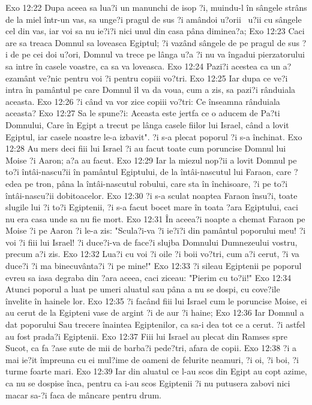Exo 12:22  Dupa aceea sa lua?i un manunchi de isop ?i, muindu-l în sângele strâns de la miel într-un vas, sa unge?i pragul de sus ?i amândoi u?orii  u?ii cu sângele cel din vas, iar voi sa nu ie?i?i nici unul din casa pâna diminea?a;
Exo 12:23  Caci are sa treaca Domnul sa loveasca Egiptul; ?i vazând sângele de pe pragul de sus ?i de pe cei doi u?ori, Domnul va trece pe lânga u?a ?i nu va îngadui pierzatorului sa intre în casele voastre, ca sa va loveasca.
Exo 12:24  Pazi?i acestea ca un a?ezamânt ve?nic pentru voi ?i pentru copiii vo?tri.
Exo 12:25  Iar dupa ce ve?i intra în pamântul pe care Domnul îl va da voua, cum a zis, sa pazi?i rânduiala aceasta.
Exo 12:26  ?i când va vor zice copiii vo?tri: Ce înseamna rânduiala aceasta?
Exo 12:27  Sa le spune?i: Aceasta este jertfa ce o aducem de Pa?ti Domnului, Care în Egipt a trecut pe lânga casele fiilor lui Israel, când a lovit Egiptul, iar casele noastre le-a izbavit". ?i s-a plecat poporul ?i s-a închinat.
Exo 12:28  Au mers deci fiii lui Israel ?i au facut toate cum poruncise Domnul lui Moise ?i Aaron; a?a au facut.
Exo 12:29  Iar la miezul nop?ii a lovit Domnul pe to?i întâi-nascu?ii în pamântul Egiptului, de la întâi-nascutul lui Faraon, care ?edea pe tron, pâna la întâi-nascutul robului, care sta în închisoare, ?i pe to?i întâi-nascu?ii dobitoacelor.
Exo 12:30  ?i s-a sculat noaptea Faraon însu?i, toate slugile lui ?i to?i Egiptenii, ?i s-a facut bocet mare în toata ?ara Egiptului, caci nu era casa unde sa nu fie mort.
Exo 12:31  În aceea?i noapte a chemat Faraon pe Moise ?i pe Aaron ?i le-a zis: "Scula?i-va ?i ie?i?i din pamântul poporului meu! ?i voi ?i fiii lui Israel! ?i duce?i-va de face?i slujba Domnului Dumnezeului vostru, precum a?i zis.
Exo 12:32  Lua?i cu voi ?i oile ?i boii vo?tri, cum a?i cerut, ?i va duce?i ?i ma binecuvânta?i ?i pe mine!"
Exo 12:33  ?i sileau Egiptenii pe poporul evreu sa iasa degraba din ?ara aceea, caci ziceau: "Pierim cu to?ii!"
Exo 12:34  Atunci poporul a luat pe umeri aluatul sau pâna a nu se dospi, cu cove?ile învelite în hainele lor.
Exo 12:35  ?i facând fiii lui Israel cum le poruncise Moise, ei au cerut de la Egipteni vase de argint ?i de aur ?i haine;
Exo 12:36  Iar Domnul a dat poporului Sau trecere înaintea Egiptenilor, ca sa-i dea tot ce a cerut. ?i astfel au fost prada?i Egiptenii.
Exo 12:37  Fiii lui Israel au plecat din Ramses spre Sucot, ca fa ?ase sute de mii de barba?i pede?tri, afara de copii.
Exo 12:38  ?i a mai ie?it împreuna cu ei mul?ime de oameni de felurite neamuri, ?i oi, ?i boi, ?i turme foarte mari.
Exo 12:39  Iar din aluatul ce l-au scos din Egipt au copt azime, ca nu se dospise înca, pentru ca i-au scos Egiptenii ?i nu putusera zabovi nici macar sa-?i faca de mâncare pentru drum.
